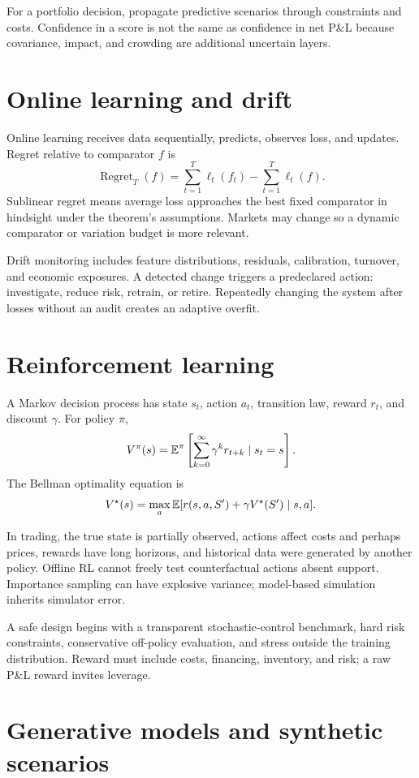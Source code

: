 For a portfolio decision, propagate predictive scenarios through constraints and
costs. Confidence in a score is not the same as confidence in net P\&L because
covariance, impact, and crowding are additional uncertain layers.

\section{Online learning and drift}

Online learning receives data sequentially, predicts, observes loss, and updates.
Regret relative to comparator $f$ is
\[
\operatorname{Regret}_T(f)=
\sum_{t=1}^T\ell_t(f_t)-\sum_{t=1}^T\ell_t(f).
\]
Sublinear regret means average loss approaches the best fixed comparator in hindsight
under the theorem's assumptions. Markets may change so a dynamic comparator or
variation budget is more relevant.

Drift monitoring includes feature distributions, residuals, calibration, turnover,
and economic exposures. A detected change triggers a predeclared action: investigate,
reduce risk, retrain, or retire. Repeatedly changing the system after losses without
an audit creates an adaptive overfit.

\section{Reinforcement learning}

A Markov decision process has state $s_t$, action $a_t$, transition law, reward
$r_t$, and discount $\gamma$. For policy $\pi$,
\[
V^\pi(s)=
\operatorname{\mathbb E}^\pi\left[
\sum_{k=0}^{\infty}\gamma^kr_{t+k}\mid s_t=s
\right].
\]
The Bellman optimality equation is
\[
V^\star(s)=
\max_a\operatorname{\mathbb E}[r(s,a,S')+\gamma V^\star(S')\mid s,a].
\]

In trading, the true state is partially observed, actions affect costs and perhaps
prices, rewards have long horizons, and historical data were generated by another
policy. Offline RL cannot freely test counterfactual actions absent support.
Importance sampling can have explosive variance; model-based simulation inherits
simulator error.

A safe design begins with a transparent stochastic-control benchmark, hard risk
constraints, conservative off-policy evaluation, and stress outside the training
distribution. Reward must include costs, financing, inventory, and risk; a raw P\&L
reward invites leverage.

\section{Generative models and synthetic scenarios}

